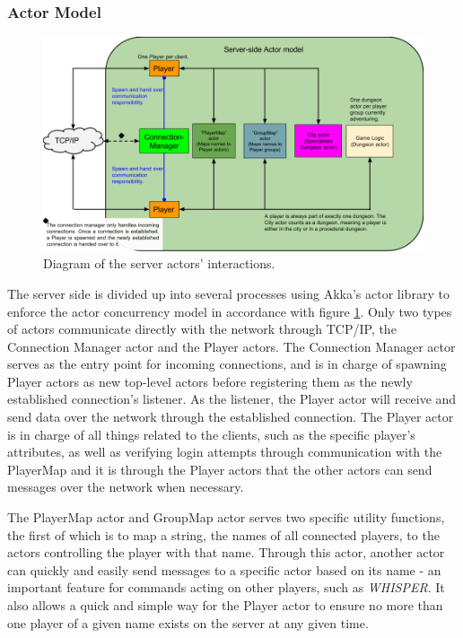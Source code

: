 \documentclass[a4paper]{article}
\begin{document}
\subsubsection{Actor Model}
\begin{figure}[ht]
\centering
\includegraphics[width=1.0\textwidth]{serveractormodel}
\caption{\label{fig:ServerActorModel}Diagram of the server actors' interactions.}
\end{figure}
The server side is divided up into several processes using Akka's actor library to enforce the actor concurrency model in accordance with figure \ref{fig:ServerActorModel}. Only two types 
of actors communicate directly with the network through TCP/IP, the Connection Manager actor and the Player actors. The Connection Manager actor serves as the entry point for incoming
connections, and is in charge of spawning Player actors as new top-level actors before registering them as the newly established connection's listener. As the listener, the Player actor
will receive and send data over the network through the established connection. The Player actor is in charge of all things related to the clients, such as the specific player's attributes,
as well as verifying login attempts through communication with the PlayerMap and it is through the Player actors that the other actors can send messages over the network when necessary.

The PlayerMap actor and GroupMap actor serves two specific utility functions, the first of which is to map a string, the names of all connected players, to the actors controlling the player 
with that name. Through this actor, another actor can quickly and easily send messages to a specific actor based on its name - an important feature for commands acting on other players, 
such as \textit{WHISPER}. It also allows a quick and simple way for the Player actor to ensure no more than one player of a given name exists on the server at any given time.
\end{document}
